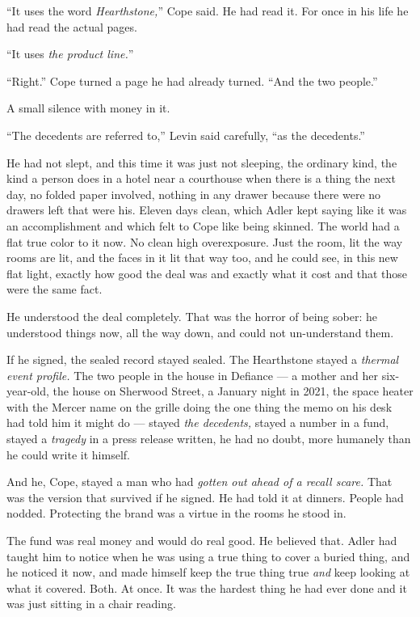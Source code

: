 \documentclass[11pt,openany]{book}
\newcommand{\scenebreak}{\par\vspace{0.5\baselineskip}\begin{center}\textasteriskcentered\quad\textasteriskcentered\quad\textasteriskcentered\end{center}\vspace{0.5\baselineskip}\par}
\begin{document}
``It uses the word \textit{Hearthstone,}'' Cope said. He had read it. For once in his life he had read the actual pages.

``It uses \textit{the product line.}''

``Right.'' Cope turned a page he had already turned. ``And the two people.''

A small silence with money in it.

``The decedents are referred to,'' Levin said carefully, ``as the decedents.''


\scenebreak


He had not slept, and this time it was just not sleeping, the ordinary kind, the kind a person does in a hotel near a courthouse when there is a thing the next day, no folded paper involved, nothing in any drawer because there were no drawers left that were his. Eleven days clean, which Adler kept saying like it was an accomplishment and which felt to Cope like being skinned. The world had a flat true color to it now. No clean high overexposure. Just the room, lit the way rooms are lit, and the faces in it lit that way too, and he could see, in this new flat light, exactly how good the deal was and exactly what it cost and that those were the same fact.

He understood the deal completely. That was the horror of being sober: he understood things now, all the way down, and could not un-understand them.

If he signed, the sealed record stayed sealed. The Hearthstone stayed a \textit{thermal event profile.} The two people in the house in Defiance --- a mother and her six-year-old, the house on Sherwood Street, a January night in 2021, the space heater with the Mercer name on the grille doing the one thing the memo on his desk had told him it might do --- stayed \textit{the decedents,} stayed a number in a fund, stayed a \textit{tragedy} in a press release written, he had no doubt, more humanely than he could write it himself.

And he, Cope, stayed a man who had \textit{gotten out ahead of a recall scare.} That was the version that survived if he signed. He had told it at dinners. People had nodded. Protecting the brand was a virtue in the rooms he stood in.

The fund was real money and would do real good. He believed that. Adler had taught him to notice when he was using a true thing to cover a buried thing, and he noticed it now, and made himself keep the true thing true \textit{and} keep looking at what it covered. Both. At once. It was the hardest thing he had ever done and it was just sitting in a chair reading.
\end{document}

